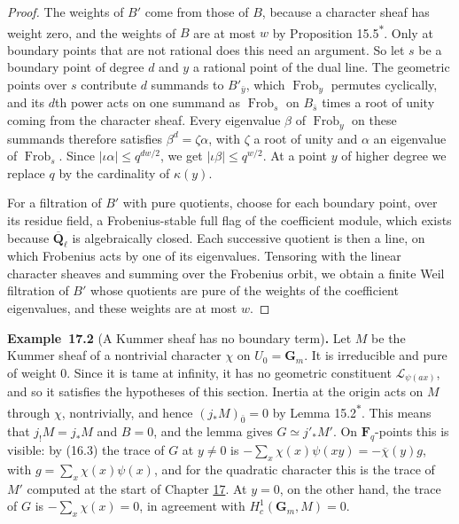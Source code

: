 \documentclass[11pt]{article}
\newenvironment{bpstatement}[2]{\par\addvspace{0.6\baselineskip}\noindent\textbf{#1}#2\textbf{.}\enspace\ignorespaces}
  {\par\addvspace{0.4\baselineskip}}
\newcommand{\bpout}[1]{#1\textsuperscript{\hyperlink{bp-outside}{\ensuremath{\ast}}}}
\begin{document}
\begin{proof}[{Proof}]
The weights of \(B'\) come from those of \(B\), because a character sheaf has weight zero, and the weights of \(B\) are at most \(w\) by Proposition \bpout{15.5}. Only at boundary points that are not rational does this need an argument. So let \(s\) be a boundary point of degree \(d\) and \(y\) a rational point of the dual line. The geometric points over \(s\) contribute \(d\) summands to \(B'_{\bar y}\), which \(\operatorname{Frob}_y\) permutes cyclically, and its \(d\)th power acts on one summand as \(\operatorname{Frob}_s\) on \(B_{\bar s}\) times a root of unity coming from the character sheaf. Every eigenvalue \(\beta\) of \(\operatorname{Frob}_y\) on these summands therefore satisfies \(\beta^d=\zeta\alpha\), with \(\zeta\) a root of unity and \(\alpha\) an eigenvalue of \(\operatorname{Frob}_s\). Since \(|\iota\alpha|\le q^{dw/2}\), we get \(|\iota\beta|\le q^{w/2}\). At a point \(y\) of higher degree we replace \(q\) by the cardinality of \(\kappa(y)\).

For a filtration of \(B'\) with pure quotients, choose for each boundary point, over its residue field, a Frobenius-stable full flag of the coefficient module, which exists because \(\overline{\mathbf Q}_\ell\) is algebraically closed. Each successive quotient is then a line, on which Frobenius acts by one of its eigenvalues. Tensoring with the linear character sheaves and summing over the Frobenius orbit, we obtain a finite Weil filtration of \(B'\) whose quotients are pure of the weights of the coefficient eigenvalues, and these weights are at most \(w\).
\end{proof}

\label{bp7}%
\begin{bpstatement}{Example~17.2}{ (A Kummer sheaf has no boundary term)}
Let \(M\) be the Kummer sheaf of a nontrivial character \(\chi\) on \(U_0=\mathbf G_m\). It is irreducible and pure of weight \(0\). Since it is tame at infinity, it has no geometric constituent \(\mathcal L_{\psi(ax)}\), and so it satisfies the hypotheses of this section. Inertia at the origin acts on \(M\) through \(\chi\), nontrivially, and hence \((j_*M)_{\bar0}=0\) by Lemma \bpout{15.2}. This means that \(j_!M=j_*M\) and \(B=0\), and the lemma gives \(G\simeq j'_*M'\). On \(\mathbf F_q\)-points this is visible: by (16.3) the trace of \(G\) at \(y\ne0\) is \(-\sum_x\chi(x)\psi(xy)=-\overline\chi(y)g\), with \(g=\sum_x\chi(x)\psi(x)\), and for the quadratic character this is the trace of \(M'\) computed at the start of Chapter \hyperref[bp1]{17}. At \(y=0\), on the other hand, the trace of \(G\) is \(-\sum_x\chi(x)=0\), in agreement with \(H^1_c(\mathbf G_m,M)=0\).
\end{bpstatement}
\end{document}
